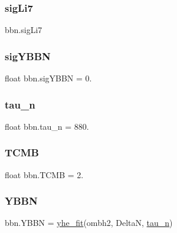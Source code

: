 \subsubsection{\texorpdfstring{sig\+Li7}{sigLi7}}
{\footnotesize\ttfamily bbn.\+sig\+Li7}

\mbox{\label{namespacebbn_a3854fe11c613aba4501a3a94b65ac9c4}} 
\subsubsection{\texorpdfstring{sig\+Y\+B\+BN}{sigYBBN}}
{\footnotesize\ttfamily float bbn.\+sig\+Y\+B\+BN = 0.}

\mbox{\label{namespacebbn_a159aaa1465ea9c0555826fa3ea17d3ed}} 
\subsubsection{\texorpdfstring{tau\+\_\+n}{tau\_n}}
{\footnotesize\ttfamily float bbn.\+tau\+\_\+n = 880.}

\mbox{\label{namespacebbn_a45c7b6e0cda690af956e72f58b332e66}} 
\subsubsection{\texorpdfstring{T\+C\+MB}{TCMB}}
{\footnotesize\ttfamily float bbn.\+T\+C\+MB = 2.}

\mbox{\label{namespacebbn_a14098dbddadc5e64b5441f3d19aaf7c1}} 
\subsubsection{\texorpdfstring{Y\+B\+BN}{YBBN}}
{\footnotesize\ttfamily bbn.\+Y\+B\+BN = \mbox{\hyperlink{namespacebbn_a661709a863752020661d412858487224}{yhe\+\_\+fit}}(ombh2, DeltaN, \mbox{\hyperlink{namespacebbn_a159aaa1465ea9c0555826fa3ea17d3ed}{tau\+\_\+n}})}

\mbox{\label{namespacebbn_a6d7727016804233cd030bc94e1f3500d}} 
